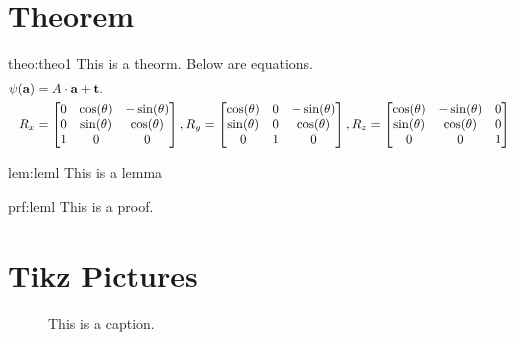 \section{Theorem}
\begin{theo}{theo:theo1}
This is a theorm. Below are equations.
\begin{align}\label{eq:multi-equations}
    \psi(\mathbf{a}) &= A\cdot \mathbf{a} + \mathbf{t}.\\
    R_x &=  \begin{bmatrix} 
            0 & \cos(\theta) & -\sin(\theta)\\
            0 & \sin(\theta) & \cos(\theta)\\
            1 & 0 & 0
         \end{bmatrix}, 
    R_y =  \begin{bmatrix} 
            \cos(\theta) & 0 & -\sin(\theta)\\
            \sin(\theta) & 0 & \cos(\theta)\\
            0 & 1 & 0
         \end{bmatrix}, 
    R_z =  \begin{bmatrix} 
            \cos(\theta) & -\sin(\theta) & 0\\
            \sin(\theta) & \cos(\theta) & 0 \\
            0 & 0 & 1
         \end{bmatrix} 
\end{align}
\end{theo}

\begin{lem}{lem:leml}
This is a lemma
\end{lem}

\begin{prf}{prf:leml}
This is a proof.
\end{prf}

\section{Tikz Pictures}
\begin{figure}[htp]
    \centering
    \caption{This is a caption. }
    \label{fig:rotation}
\end{figure}





